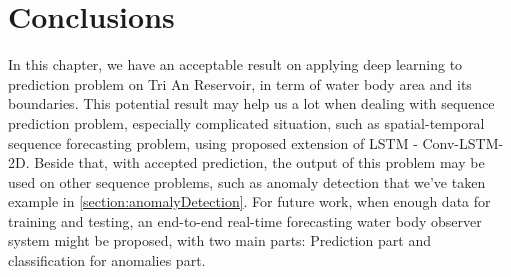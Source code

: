 \section{Conclusions}

In this chapter, we have an acceptable result on applying deep learning to prediction problem on Tri An Reservoir, in term of water body area and its boundaries. This potential result may help us a lot when dealing with sequence prediction problem, especially complicated situation, such as spatial-temporal sequence forecasting problem, using proposed extension of LSTM - Conv-LSTM-2D. Beside that, with accepted prediction, the output of this problem may be used on other sequence problems, such as anomaly detection that we've taken example in \ref{section:anomalyDetection}. For future work, when enough data for training and testing, an end-to-end real-time forecasting water body observer system might be proposed, with two main parts: Prediction part and classification for anomalies part. 